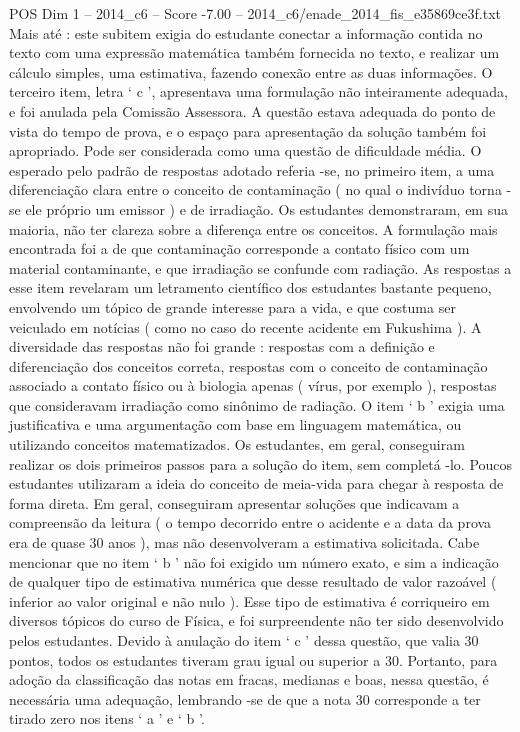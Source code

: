 \begin{textsample}{POS Dim 1 – 2014\_c6 – Score -7.00 – 2014\_c6/enade\_2014\_fis\_e35869ce3f.txt}
Mais até : este subitem exigia do estudante conectar a informação contida no texto com uma expressão matemática também fornecida no texto, e realizar um cálculo simples, uma estimativa, fazendo conexão entre as duas informações.
O terceiro item, letra ‘ c ’, apresentava uma formulação não inteiramente adequada, e foi anulada pela Comissão Assessora.
A questão estava adequada do ponto de vista do tempo de prova, e o espaço para apresentação da solução também foi apropriado.
Pode ser considerada como uma questão de dificuldade média.
O esperado pelo padrão de respostas adotado referia -se, no primeiro item, a uma diferenciação clara entre o conceito de contaminação ( no qual o indivíduo torna -se ele próprio um emissor ) e de irradiação.
Os estudantes demonstraram, em sua maioria, não ter clareza sobre a diferença entre os conceitos.
A formulação mais encontrada foi a de que contaminação corresponde a contato físico com um material contaminante, e que irradiação se confunde com radiação.
As respostas a esse item revelaram um letramento científico dos estudantes bastante pequeno, envolvendo um tópico de grande interesse para a vida, e que costuma ser veiculado em notícias ( como no caso do recente acidente em Fukushima ).
A diversidade das respostas não foi grande : respostas com a definição e diferenciação dos conceitos correta, respostas com o conceito de contaminação associado a contato físico ou à biologia apenas ( vírus, por exemplo ), respostas que consideravam irradiação como sinônimo de radiação.
O item ‘ b ’ exigia uma justificativa e uma argumentação com base em linguagem matemática, ou utilizando conceitos matematizados.
Os estudantes, em geral, conseguiram realizar os dois primeiros passos para a solução do item, sem completá -lo.
Poucos estudantes utilizaram a ideia do conceito de meia-vida para chegar à resposta de forma direta.
Em geral, conseguiram apresentar soluções que indicavam a compreensão da leitura ( o tempo decorrido entre o acidente e a data da prova era de quase 30 anos ), mas não desenvolveram a estimativa solicitada.
Cabe mencionar que no item ‘ b ’ não foi exigido um número exato, e sim a indicação de qualquer tipo de estimativa numérica que desse resultado de valor razoável ( inferior ao valor original e não nulo ).
Esse tipo de estimativa é corriqueiro em diversos tópicos do curso de Física, e foi surpreendente não ter sido desenvolvido pelos estudantes.
Devido à anulação do item ‘ c ’ dessa questão, que valia 30 pontos, todos os estudantes tiveram grau igual ou superior a 30.
Portanto, para adoção da classificação das notas em fracas, medianas e boas, nessa questão, é necessária uma adequação, lembrando -se de que a nota 30 corresponde a ter tirado zero nos itens ‘ a ’ e ‘ b ’.

\end{textsample}
